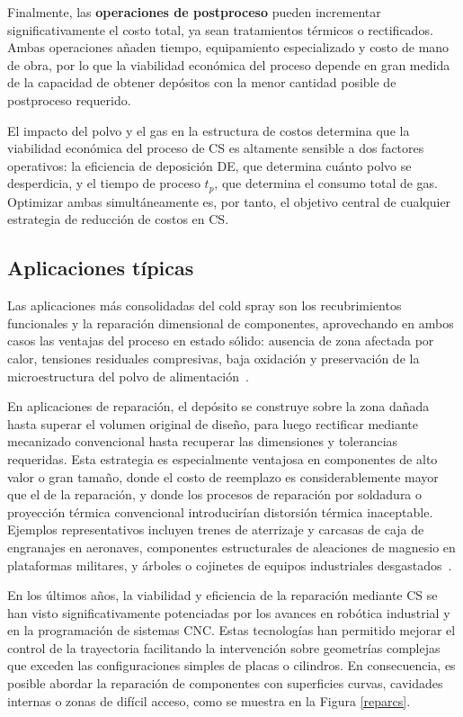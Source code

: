 Finalmente, las \textbf{operaciones de postproceso} pueden incrementar 
significativamente el costo total, ya sean tratamientos térmicos o rectificados. Ambas operaciones añaden tiempo, 
equipamiento especializado y costo de mano de obra, por lo que la viabilidad 
económica del proceso depende en gran medida de la capacidad de obtener 
depósitos con la menor cantidad posible de postproceso requerido.

El impacto del polvo y el gas en la estructura de costos determina que la 
viabilidad económica del proceso de CS es altamente sensible a dos 
factores operativos: la eficiencia de deposición DE, que determina 
cuánto polvo se desperdicia, y el tiempo de proceso $t_p$, que determina el 
consumo total de gas. Optimizar ambas simultáneamente es, por tanto, el 
objetivo central de cualquier estrategia de reducción de costos en CS.

\subsection{Aplicaciones típicas}

Las aplicaciones más consolidadas del cold spray son los recubrimientos 
funcionales y la reparación dimensional de componentes, aprovechando en ambos 
casos las ventajas del proceso en estado sólido: ausencia de zona afectada 
por calor, tensiones residuales compresivas, baja oxidación y preservación 
de la microestructura del polvo de alimentación~\cite{Champagne2016unique}.


En aplicaciones de reparación, el depósito se construye sobre la zona dañada 
hasta superar el volumen original de diseño, para luego rectificar mediante 
mecanizado convencional hasta recuperar las dimensiones y tolerancias 
requeridas. Esta estrategia es especialmente ventajosa en componentes de 
alto valor o gran tamaño, donde el costo de reemplazo es considerablemente 
mayor que el de la reparación, y donde los procesos de reparación por 
soldadura o proyección térmica convencional introducirían distorsión térmica 
inaceptable. Ejemplos representativos incluyen trenes de aterrizaje y 
carcasas de caja de engranajes en aeronaves, componentes estructurales de 
aleaciones de magnesio en plataformas militares, y árboles o 
cojinetes de equipos industriales desgastados~\cite{Champagne2015repairs}.

En los últimos años, la viabilidad y eficiencia de la reparación mediante CS se han visto significativamente potenciadas por los avances en robótica industrial y en la programación de sistemas CNC. Estas tecnologías han permitido mejorar el control de la trayectoria facilitando la intervención sobre geometrías complejas que exceden las configuraciones simples de placas o cilindros. En consecuencia, es posible abordar la reparación de componentes con superficies curvas, cavidades internas o zonas de difícil acceso, como se muestra en la Figura \ref{reparcs}. 

